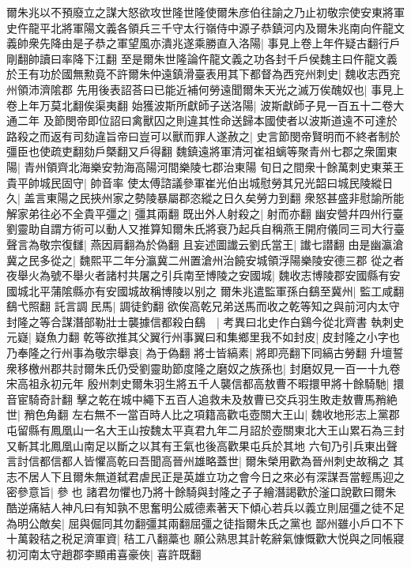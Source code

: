 爾朱兆以不預廢立之謀大怒欲攻世隆世隆使爾朱彦伯往諭之乃止初敬宗使安東將軍史仵龍平北將軍陽文義各領兵三千守太行嶺侍中源子恭鎮河内及爾朱兆南向仵龍文義帥衆先降由是子恭之軍望風亦潰兆遂乘勝直入洛陽|{
	事見上卷上年仵疑古翻行戶剛翻帥讀曰率降下江翻}
至是爾朱世隆論仵龍文義之功各封千戶侯魏主曰仵龍文義於王有功於國無勲竟不許爾朱仲遠鎮滑臺表用其下都督為西兖州刺史|{
	魏收志西兖州領沛濟隂郡}
先用後表詔荅曰已能近補何勞遠聞爾朱天光之滅万俟醜奴也|{
	事見上卷上年万莫北翻俟渠夷翻}
始獲波斯所獻師子送洛陽|{
	波斯獻師子見一百五十二卷大通二年}
及節閔帝即位詔曰禽獸囚之則違其性命送歸本國使者以波斯道遠不可達於路殺之而返有司劾違旨帝曰豈可以獸而罪人遂赦之|{
	史言節閔帝賢明而不終者制於彊臣也使疏吏翻劾戶槩翻又戶得翻}
魏鎮遠將軍清河崔祖螭等聚青州七郡之衆圍東陽|{
	青州領齊北海樂安勃海高陽河間樂陵七郡治東陽}
旬日之間衆十餘萬刺史東莱王貴平帥城民固守|{
	帥音率}
使太傅諮議參軍崔光伯出城慰勞其兄光韶曰城民陵縱日久|{
	盖言東陽之民挾州家之勢陵暴屬郡恣縱之日久矣勞力到翻}
衆怒甚盛非慰諭所能解家弟往必不全貴平彊之|{
	彊其兩翻}
既出外人射殺之|{
	射而亦翻}
幽安營幷四州行臺劉靈助自謂方術可以動人又推算知爾朱氏將衰乃起兵自稱燕王開府儀同三司大行臺聲言為敬宗復讎|{
	燕因肩翻為於偽翻}
且妄述圖䜟云劉氏當王|{
	䜟七譛翻}
由是幽瀛滄冀之民多從之|{
	魏熙平二年分瀛冀二州置滄州治饒安城領浮陽樂陵安德三郡}
從之者夜舉火為號不舉火者諸村共屠之引兵南至博陵之安國城|{
	魏收志博陵郡安國縣有安國城北平蒲隂縣亦有安國城故稱博陵以别之}
爾朱兆遣監軍孫白鷂至冀州|{
	監工咸翻鷂弋照翻}
託言調民馬|{
	調徒釣翻}
欲俟高乾兄弟送馬而收之乾等知之與前河内太守封隆之等合謀潛部勒壯士襲據信都殺白鷂　|{
	考異曰北史作白鷄今從北齊書}
執刺史元嶷|{
	嶷魚力翻}
乾等欲推其父翼行州事翼曰和集鄉里我不如封皮|{
	皮封隆之小字也}
乃奉隆之行州事為敬宗舉哀|{
	為于偽翻}
將士皆縞素|{
	將即亮翻下同縞古勞翻}
升壇誓衆移檄州郡共討爾朱氏仍受劉靈助節度隆之磨奴之族孫也|{
	封磨奴見一百一十九卷宋高祖永初元年}
殷州刺史爾朱羽生將五千人襲信都高敖曹不暇擐甲將十餘騎馳|{
	擐音宦騎奇計翻}
擊之乾在城中繩下五百人追救未及敖曹已交兵羽生敗走敖曹馬矟絶世|{
	矟色角翻}
左右無不一當百時人比之項籍高歡屯壺關大王山|{
	魏收地形志上黨郡屯留縣有鳳凰山一名大王山按魏太平真君九年二月詔於壺關東北大王山累石為三封又斬其北鳳凰山南足以斷之以其有王氣也後高歡果屯兵於其地}
六旬乃引兵東出聲言討信都信都人皆懼高乾曰吾聞高晉州雄略蓋世|{
	爾朱榮用歡為晉州刺史故稱之}
其志不居人下且爾朱無道弑君虐民正是英雄立功之會今日之來必有深謀吾當輕馬迎之密參意旨|{
	參也}
諸君勿懼也乃將十餘騎與封隆之子子繪潛謁歡於滏口說歡曰爾朱酷逆痛結人神凡曰有知孰不思奮明公威德素著天下傾心若兵以義立則屈彊之徒不足為明公敵矣|{
	屈與倔同其勿翻彊其兩翻屈彊之徒指爾朱氏之黨也}
鄙州雖小戶口不下十萬穀秸之税足濟軍資|{
	秸工八翻藁也}
願公熟思其計乾辭氣慷慨歡大悦與之同帳寢初河南太守趙郡李顯甫喜豪俠|{
	喜許既翻}
